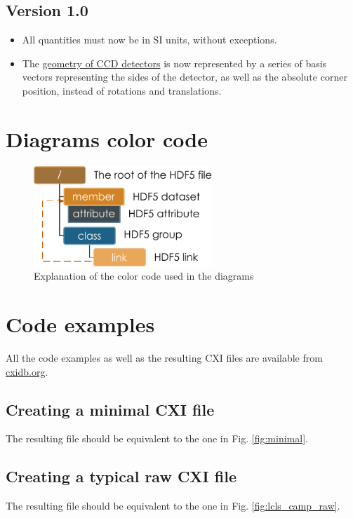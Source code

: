 \documentclass[usletter,11pt]{article}
\begin{document}
\subsection{Version 1.0}
\begin{itemize}
\item{All quantities must now be in SI units, without exceptions.}
\item{The \hyperref[ccd_orientation]{geometry of CCD detectors} is now represented by a series of
    basis vectors representing the sides of the detector, as well as
    the absolute corner position, instead of rotations and translations.}
\end{itemize}


\clearpage
\section{Diagrams color code}
\label{color_code}

\begin{figure}[h!]
\centering
\includegraphics[width=0.6\textwidth]{diagram_labels.pdf}
\caption{Explanation of the color code used in the diagrams}
\label{fig:color_code}
\end{figure}

\clearpage
\section{Code examples}

All the code examples as well as the resulting CXI files are available from \url{cxidb.org}.
 
\subsection{Creating a minimal CXI file}

The resulting file should be equivalent to the one in
Fig. \ref{fig:minimal}.

\clearpage
\subsection{Creating a typical raw CXI file}

The resulting file should be equivalent to the one in
Fig. \ref{fig:lcls_camp_raw}.
\end{document}
